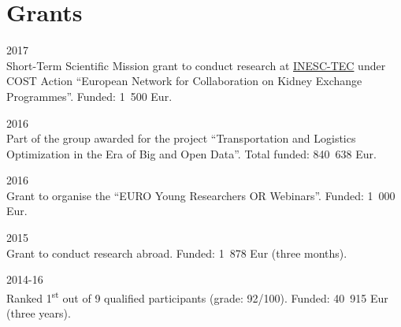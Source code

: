\section*{Grants}

\begin{paracol}{2}
  \textsc{2017}
\switchcolumn
  \\
  Short-Term Scientific Mission grant to conduct research at \href{https://www.inesctec.pt/}{INESC-TEC} under COST Action ``European Network for Collaboration on Kidney Exchange Programmes''.
  Funded: 1~500 Eur.
\end{paracol}

\begin{paracol}{2}
  \textsc{2016}
\switchcolumn
  \\
  Part of the group awarded for the project ``Transportation and Logistics Optimization in the Era of Big and Open Data''.
  Total funded: 840~638 Eur.
\end{paracol}

\begin{paracol}{2}
  \textsc{2016}
\switchcolumn
  \\
  Grant to organise the ``EURO Young Researchers OR Webinars''.
  Funded: 1~000 Eur.
\end{paracol}

\begin{paracol}{2}
  \textsc{2015}
\switchcolumn
  \\
  Grant to conduct research abroad.
  Funded: 1~878 Eur (three months).
\end{paracol}

\begin{paracol}{2}
  \textsc{2014-16}
\switchcolumn
  \\
  Ranked 1\textsuperscript{st} out of 9 qualified participants (grade: 92/100).
  Funded: 40~915 Eur (three years).
\end{paracol}
